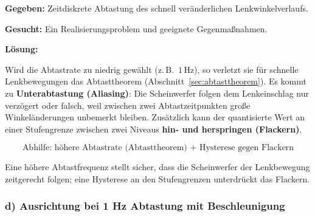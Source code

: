 \begin{beispiel}

\textbf{Gegeben:} Zeitdiskrete Abtastung des schnell veränderlichen
Lenkwinkelverlaufs.

\textbf{Gesucht:} Ein Realisierungsproblem und geeignete Gegenmaßnahmen.

\textbf{Lösung:}

Wird die Abtastrate zu niedrig gewählt (z.\,B.\ $1\,\text{Hz}$), so verletzt sie
für schnelle Lenkbewegungen das Abtasttheorem
(Abschnitt~\ref{sec:abtasttheorem}). Es kommt zu \textbf{Unterabtastung
(Aliasing)}: Die Scheinwerfer folgen dem Lenkeinschlag nur verzögert oder falsch,
weil zwischen zwei Abtastzeitpunkten große Winkeländerungen unbemerkt bleiben.
Zusätzlich kann der quantisierte Wert an einer Stufengrenze zwischen zwei Niveaus
\textbf{hin- und herspringen (Flackern)}.

$$
\boxed{\;\text{Abhilfe: höhere Abtastrate (Abtasttheorem) + Hysterese gegen Flackern}\;}
$$

Eine höhere Abtastfrequenz stellt sicher, dass die Scheinwerfer der Lenkbewegung
zeitgerecht folgen; eine Hysterese an den Stufengrenzen unterdrückt das Flackern.

\end{beispiel}

\subsubsection*{d) Ausrichtung bei 1 Hz Abtastung mit Beschleunigung}

